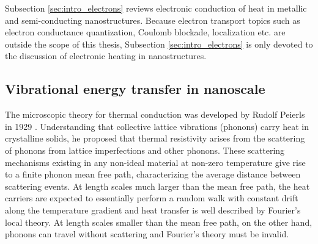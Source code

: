 Subsection \ref{sec:intro_electrons} reviews electronic conduction of heat in metallic and semi-conducting nanostructures. Because electron transport topics such as electron conductance quantization, Coulomb blockade, localization etc. are outside the scope of this thesis, Subsection \ref{sec:intro_electrons} is only devoted to the discussion of electronic heating in nanostructures. %



\subsection{Vibrational energy transfer in nanoscale}
\label{sec:intro_vib}
The microscopic theory for thermal conduction was developed by Rudolf Peierls in 1929 \cite{peierls29}. Understanding that collective lattice vibrations (phonons) carry heat in crystalline solids, he proposed that thermal resistivity arises from the scattering of phonons from lattice imperfections and other phonons. These scattering mechanisms existing in any non-ideal material at non-zero temperature give rise to a finite phonon mean free path, characterizing the average distance between scattering events. At length scales much larger than the mean free path, the heat carriers are expected to essentially perform a random walk with constant drift along the temperature gradient and heat transfer is well described by Fourier's local theory. At length scales smaller than the mean free path, on the other hand, phonons can travel without scattering and Fourier's theory must be invalid. 


